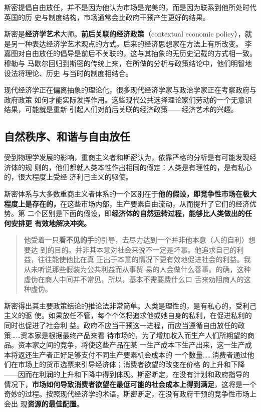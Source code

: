 斯密提倡自由放任，并不是因为他认为市场是完美的，而是因为联系到他所处时代英国的历
史与制度结构，市场通常会比政府干预产生更好的结果。

斯密是\textbf{经济学艺术}大师。\textbf{前后关联的经济政策}（contextual economic
policy），就是另一种表达经济学艺术观点的方式。后来的经济思想家在方法上有所改变。
李嘉图对自由放任的倡导是前后不关联的，这与其抽象的无历史记载的方式相一致。穆勒与
马歇尔回归到斯密的传统上来，在所做的分析与政策结论中，他们明智地设法将理论、历史
与当时的制度相结合。

现代经济学正在偏离抽象的理论化，很多现代经济学家与政治学家正在考察政府与政府政策
如何才能实际发挥作用。这些现代公共选择理论家们劳动的一个无意识结果，可能就是重新
引起人们对前后关联的经济政策——经济艺术的兴趣。

\subsection{自然秩序、和谐与自由放任}

受到物理学发展的影响，重商主义者和斯密认为，依靠严格的分析是有可能发现经济体的规
则的，他们都就人类本性作出相同的假定：人类是有理性的，是有私心的，很大程度上受经
济利己主义的驱使。

斯密体系与大多数重商主义者体系的一个区别在于\textbf{他的假设，即竞争性市场在极大
  程度上是存在的，}在这些市场内部，生产要素自由流动，从而提升了它们的经济优势。第
二个区别是下面的假设，即\textbf{经济体的自然运转过程，能够比人类做出的任何安排更
  有效地解决冲突。}

\begin{quotation}
  他受着一只\textbf{看不见的手}的引导，去尽力达到一个并非他本意（人的自利）想要达
  到的目的。并非其本意对社会来说不一定是坏事。他追求自己的利益，往往能使他比在真
  正出于本意的情况下更有效地促进社会的利益。我从未听说那些假装为公共利益而从事贸
  易的人会做什么善事。的确，这种虚伪在商人中间并不常见，所以，基本不需要费什么口
  舌来劝阻商人的这种虚伪。
\end{quotation}

斯密得出其主要政策结论的推论法非常简单。人类是理性的，是有私心的，受利己主义的驱
使。如果放任不管，每个个体将追求他或她自身的私利，在促进私利的同时也促进了社会利
益。政府不应当干预这一进程，而应当遵循自由放任的政策……资本家是根据最终产品来看
待市场的，为了增加收入而生产人们所期望的商品。资本家之间的竞争，将使这些产品在某
一生产成本下生产出来，这一生产成本将返还生产者正好足够支付不同生产要素机会成本的
一个数量……消费者通过他们在市场上的货币选票来引导经济体；消费者欲望的改变在价格
的上升和下降——因而在利润的上升和下降中得到体现。斯密断定，在没有计划和政府指导的
情况下，\textbf{市场如何导致消费者欲望在最低可能的社会成本上得到满足}，这将是一个
奇妙的过程。按照现代经济学的术语，斯密断定，在没有政府干预的竞争性市场上会出
现\textbf{资源的最佳配置}。

